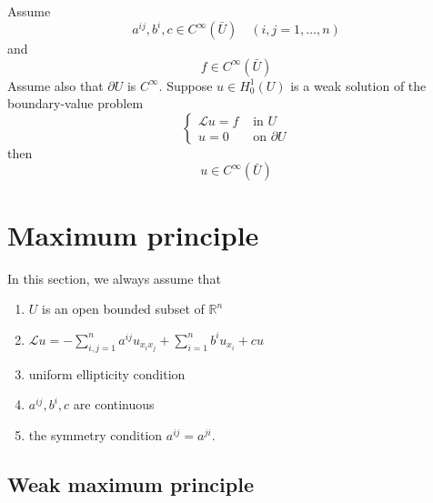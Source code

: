 \begin{theorem}
    Assume
    \begin{equation*}
        a^{i j}, b^i, c \in C^{\infty}(\bar{U}) \quad(i, j=1, \ldots, n)
    \end{equation*}
    and
    \begin{equation*}
        f \in C^{\infty}(\bar{U})
    \end{equation*}
    Assume also that $\partial U$ is $C^{\infty}$.
    Suppose $u \in H_0^1(U)$ is a weak solution of the boundary-value problem
    \begin{equation*}
        \left\{
        \begin{aligned}
            \mathcal{L}u=f & \text { in } U          \\
            u=0            & \text { on } \partial U
        \end{aligned}\right.
    \end{equation*}
    then
    \begin{equation*}
        u \in C^{\infty}(\bar{U})
    \end{equation*}
\end{theorem}


\section{Maximum principle} %
In this section, we always assume that

\begin{enumerate}
    \item
          $U$ is an open bounded subset of $\mathbb{R}^n$
    \item
          $\mathcal{L}u=-\sum_{i, j=1}^n a^{i j} u_{x_i x_j}+\sum_{i=1}^n b^i u_{x_i}+c u$
    \item
          uniform ellipticity condition
    \item
          $a^{ij},b^i,c$ are continuous
    \item
          the symmetry condition $a^{ij}=a^{ji}$.
\end{enumerate}
\subsection{Weak maximum principle}

